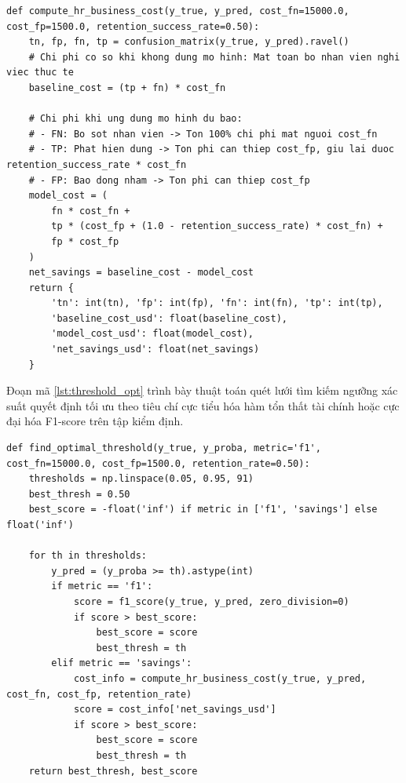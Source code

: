 \documentclass[12pt,a4paper]{article}
\begin{document}
\begin{lstlisting}[caption={Hàm tính toán chi phí và hiệu quả kinh tế HR (\texttt{src/evaluation.py}).}, label={lst:roi_calculator}]
def compute_hr_business_cost(y_true, y_pred, cost_fn=15000.0, cost_fp=1500.0, retention_success_rate=0.50):
    tn, fp, fn, tp = confusion_matrix(y_true, y_pred).ravel()
    # Chi phi co so khi khong dung mo hinh: Mat toan bo nhan vien nghi viec thuc te
    baseline_cost = (tp + fn) * cost_fn
    
    # Chi phi khi ung dung mo hinh du bao:
    # - FN: Bo sot nhan vien -> Ton 100% chi phi mat nguoi cost_fn
    # - TP: Phat hien dung -> Ton phi can thiep cost_fp, giu lai duoc retention_success_rate * cost_fn
    # - FP: Bao dong nham -> Ton phi can thiep cost_fp
    model_cost = (
        fn * cost_fn +
        tp * (cost_fp + (1.0 - retention_success_rate) * cost_fn) +
        fp * cost_fp
    )
    net_savings = baseline_cost - model_cost
    return {
        'tn': int(tn), 'fp': int(fp), 'fn': int(fn), 'tp': int(tp),
        'baseline_cost_usd': float(baseline_cost),
        'model_cost_usd': float(model_cost),
        'net_savings_usd': float(net_savings)
    }
\end{lstlisting}

Đoạn mã \ref{lst:threshold_opt} trình bày thuật toán quét lưới tìm kiếm ngưỡng xác suất quyết định tối ưu theo tiêu chí cực tiểu hóa hàm tổn thất tài chính hoặc cực đại hóa F1-score trên tập kiểm định.

\begin{lstlisting}[caption={Thuật toán tối ưu hóa ngưỡng quyết định (\texttt{src/evaluation.py}).}, label={lst:threshold_opt}]
def find_optimal_threshold(y_true, y_proba, metric='f1', cost_fn=15000.0, cost_fp=1500.0, retention_rate=0.50):
    thresholds = np.linspace(0.05, 0.95, 91)
    best_thresh = 0.50
    best_score = -float('inf') if metric in ['f1', 'savings'] else float('inf')
    
    for th in thresholds:
        y_pred = (y_proba >= th).astype(int)
        if metric == 'f1':
            score = f1_score(y_true, y_pred, zero_division=0)
            if score > best_score:
                best_score = score
                best_thresh = th
        elif metric == 'savings':
            cost_info = compute_hr_business_cost(y_true, y_pred, cost_fn, cost_fp, retention_rate)
            score = cost_info['net_savings_usd']
            if score > best_score:
                best_score = score
                best_thresh = th
    return best_thresh, best_score
\end{lstlisting}
\end{document}
